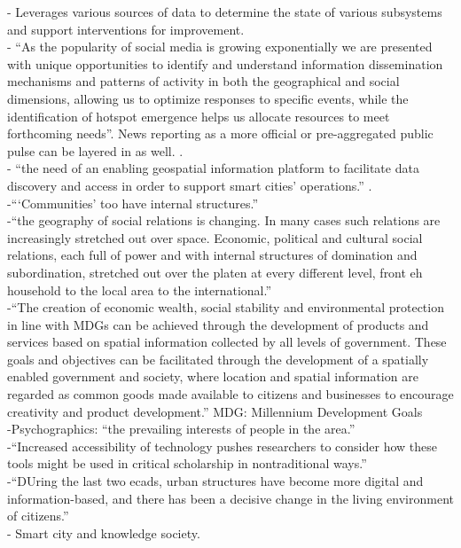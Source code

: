 - {\color{purple}Leverages various sources of data to determine the state of various subsystems and support interventions for improvement.}  \\
- {\color{orange}“As the popularity of social media is growing exponentially we are presented with unique opportunities to identify and understand information dissemination mechanisms and patterns of activity in both the geographical and social dimensions, allowing us to optimize responses to specific events, while the identification of hotspot emergence helps us allocate resources to meet forthcoming needs”.} {\color{purple}News reporting as a more official or pre-aggregated public pulse can be layered in as well}. \cite{Oliveira2021}.\\
- {\color{orange}``the need of an enabling geospatial information platform to facilitate data discovery and access in order to support smart cities’ operations.” \cite{Roche2012}.}\\
-{\color{orange}“‘Communities’ too have internal structures.”}\cite{MasseyD1991}\\
-{\color{orange}“the geography of social relations is changing. In many cases such relations are increasingly stretched out over space. Economic, political and cultural social relations, each full of power and with internal structures of domination and subordination, stretched out over the platen at every different level, front eh household to the local area to the international.”}\cite{MasseyD1991}\\
-{\color{orange}“The creation of economic wealth, social stability and environmental protection in line with MDGs can be achieved through the development of products and services based on spatial information collected by all levels of government. These goals and objectives can be facilitated through the development of a spatially enabled government and society, where location and spatial information are regarded as common goods made available to citizens and businesses to encourage creativity and product development.” MDG: Millennium Development Goals}\cite{Rajabifard2009}\\
-{\color{orange}Psychographics: “the prevailing interests of people in the area.”}\cite{Chiappinelli2020}\\
-{\color{orange}“Increased accessibility of technology pushes researchers to consider how these tools might be used in critical scholarship in nontraditional ways.”\cite{McQueenBaker2019}}\\
-{\color{orange}“DUring the last two ecads, urban structures have become more digital and information-based, and there has been a decisive change in the living environment of citizens.”\cite{Rivera2020}}\\
-{\color{orange} Smart city and knowledge society.\cite{Rivera2020}}\\



